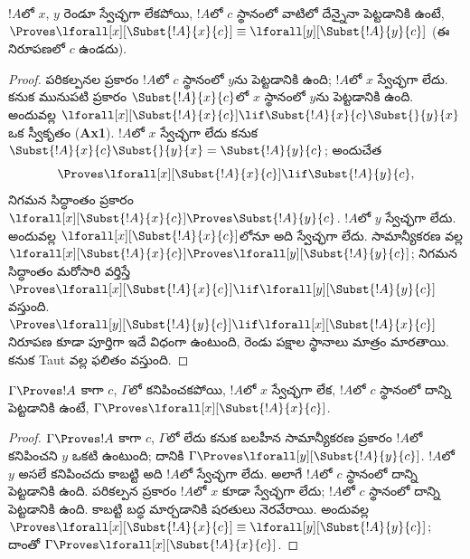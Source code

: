 \documentclass[../../../include/open-logic-section]{subfiles}
\begin{document}
\begin{lem}[బద్ధ చరం పేరు మార్చడం]
$!A$లో $x$, $y$ రెండూ స్వేచ్ఛగా లేకపోయి, $!A$లో $c$ స్థానంలో వాటిలో దేన్నైనా పెట్టడానికి  ఉంటే, $\Proves \lforall[x][\Subst{!A}{x}{c}] \equiv
\lforall[y][\Subst{!A}{y}{c}]$ (ఈ నిరూపణలో $c$ ఉండదు).
\end{lem}

\begin{proof}
పరికల్పనల ప్రకారం $!A$లో $c$ స్థానంలో $y$ను పెట్టడానికి  ఉంది; $!A$లో $x$ స్వేచ్ఛగా లేదు. కనుక మునుపటి  ప్రకారం $\Subst{!A}{x}{c}$లో $x$ స్థానంలో $y$ను పెట్టడానికి  ఉంది. అందువల్ల $\lforall[x][\Subst{!A}{x}{c}] \lif \Subst{!A}{x}{c} \Subst{}{y}{x}$ ఒక స్వీకృతం (\textbf{Ax1}). $!A$లో $x$ స్వేచ్ఛగా లేదు కనుక $\Subst{!A}{x}{c} \Subst{}{y}{x} = \Subst{!A}{y}{c}$; అందుచేత
\[
\Proves \lforall[x][\Subst{!A}{x}{c}] \lif \Subst{!A}{y}{c},
\]
నిగమన సిద్ధాంతం ప్రకారం $\lforall[x][\Subst{!A}{x}{c}] \Proves
\Subst{!A}{y}{c}$. $!A$లో $y$ స్వేచ్ఛగా లేదు. అందువల్ల $\lforall[x][\Subst{!A}{x}{c}]$లోనూ అది స్వేచ్ఛగా లేదు. సామాన్యీకరణ వల్ల $\lforall[x][\Subst{!A}{x}{c}] \Proves \lforall[y][\Subst{!A}{y}{c}]$; నిగమన సిద్ధాంతం మరోసారి వర్తిస్తే $\Proves
\lforall[x][\Subst{!A}{x}{c}] \lif \lforall[y][\Subst{!A}{y}{c}]$ వస్తుంది. $\Proves \lforall[y][\Subst{!A}{y}{c}] \lif \lforall[x]
[\Subst{!A}{x}{c}]$ నిరూపణ కూడా పూర్తిగా ఇదే విధంగా ఉంటుంది, రెండు పక్షాల స్థానాలు మాత్రం మారతాయి. కనుక Taut వల్ల ఫలితం వస్తుంది.
\end{proof}

\begin{thm}
$\Gamma \Proves !A$ కాగా  $c$, $\Gamma$లో కనిపించకపోయి, $!A$లో $x$ స్వేచ్ఛగా లేక, $!A$లో $c$ స్థానంలో దాన్ని పెట్టడానికి  ఉంటే, $\Gamma \Proves \lforall[x][\Subst{!A}{x}{c}]$.
\end{thm}

\begin{proof}
$\Gamma \Proves !A$ కాగా $c$, $\Gamma$లో లేదు కనుక బలహీన సామాన్యీకరణ ప్రకారం $!A$లో కనిపించని  $y$ ఒకటి ఉంటుంది; దానికి $\Gamma \Proves \lforall[y][\Subst{!A}{y}{c}]$. $!A$లో $y$ అసలే కనిపించదు కాబట్టి అది $!A$లో స్వేచ్ఛగా లేదు. అలాగే $!A$లో $c$ స్థానంలో దాన్ని పెట్టడానికి  ఉంది. పరికల్పన ప్రకారం $!A$లో $x$ కూడా స్వేచ్ఛగా లేదు; $!A$లో $c$ స్థానంలో దాన్ని పెట్టడానికి  ఉంది. కాబట్టి బద్ధ  మార్చడానికి షరతులు నెరవేరాయి. అందువల్ల $\Proves \lforall[x][\Subst{!A}{x}{c}] \equiv
\lforall[y][\Subst{!A}{y}{c}]$; దాంతో $\Gamma \Proves
\lforall[x][\Subst{!A}{x}{c}]$.
\end{proof}
\end{document}
